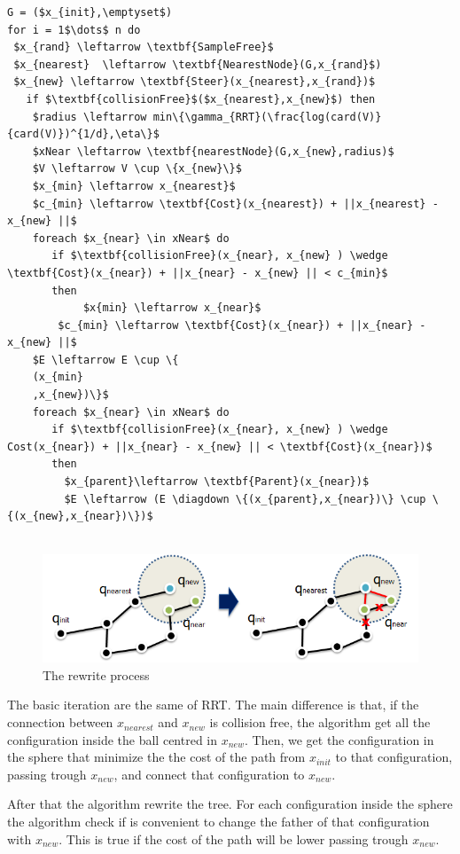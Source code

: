 \documentclass[10pt]{article}
\begin{document}
		\begin{lstlisting}[frame=single, mathescape=true,caption={RRT*}]
G = ($x_{init},\emptyset$)
for i = 1$\dots$ n do
 $x_{rand} \leftarrow \textbf{SampleFree}$
 $x_{nearest}  \leftarrow \textbf{NearestNode}(G,x_{rand}$)
 $x_{new} \leftarrow \textbf{Steer}(x_{nearest},x_{rand})$	
   if $\textbf{collisionFree}$($x_{nearest},x_{new}$) then
	$radius \leftarrow min\{\gamma_{RRT}(\frac{log(card(V)}{card(V)})^{1/d},\eta\}$
	$xNear \leftarrow \textbf{nearestNode}(G,x_{new},radius)$
	$V \leftarrow V \cup \{x_{new}\}$
	$x_{min} \leftarrow x_{nearest}$
	$c_{min} \leftarrow \textbf{Cost}(x_{nearest}) + ||x_{nearest} - x_{new} ||$
	foreach $x_{near} \in xNear$ do
	   if $\textbf{collisionFree}(x_{near}, x_{new} ) \wedge \textbf{Cost}(x_{near}) + ||x_{near} - x_{new} || < c_{min}$
	   then
	        $x{min} \leftarrow x_{near}$
		$c_{min} \leftarrow \textbf{Cost}(x_{near}) + ||x_{near} - x_{new} ||$
	$E \leftarrow E \cup \{
	(x_{min}
	,x_{new})\}$
	foreach $x_{near} \in xNear$ do
	   if $\textbf{collisionFree}(x_{near}, x_{new} ) \wedge Cost(x_{near}) + ||x_{near} - x_{new} || < \textbf{Cost}(x_{near})$
	   then
	     $x_{parent}\leftarrow \textbf{Parent}(x_{near})$
	     $E \leftarrow (E \diagdown \{(x_{parent},x_{near})\} \cup \{(x_{new},x_{near})\})$
	
	\end{lstlisting}
	\FloatBarrier
	\begin{figure}[hbt]
		\centering
		\includegraphics[width=\linewidth]{rrtRew.png}
		\caption{The rewrite process}
		\label{fig:rewrite}
	\end{figure}
	\FloatBarrier
	The basic iteration are the same of RRT. The main difference is that, if the connection between $x_{nearest}$ and $x_{new}$ is collision free, the algorithm get all the configuration inside the ball centred in $x_{new}$. Then, we get the configuration in the sphere that minimize the the cost of the path from $x_{init}$ to that configuration, passing trough $x_{new}$, and connect that configuration to $x_{new}$.
	
	After that the algorithm rewrite the tree. For each configuration inside the sphere the algorithm check if is convenient to change the father of that configuration with $x_{new}$. This is true if the cost of the path will be lower passing trough $x_{new}$.
	
\end{document}
